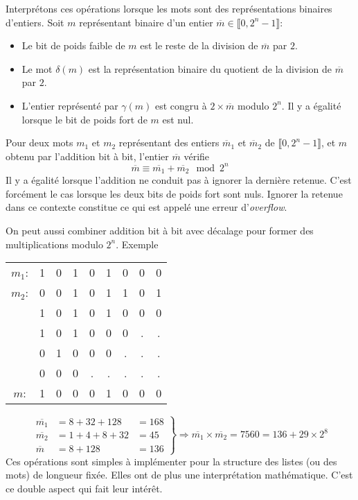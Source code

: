 \begin{enumerate}
Interprétons ces opérations lorsque les mots sont des représentations binaires d'entiers. Soit $m$ représentant binaire d'un entier $\overline{m}\in \llbracket 0, 2^{n}-1 \rrbracket$:
\begin{itemize}
  \item Le bit de poids faible de $m$ est le reste de la division de $\overline{m}$ par $2$.
  \item Le mot $\delta(m)$ est la représentation binaire du quotient de la division de $\overline{m}$ par $2$.
  \item L'entier représenté par $\gamma(m)$ est congru à $2\times\overline{m}$ modulo $2^{n}$. Il y a égalité lorsque le bit de poids fort de $m$ est nul.
\end{itemize}
Pour deux mots $m_1$ et $m_2$ représentant des entiers $\overline{m}_1$ et $\overline{m}_2$ de $ \llbracket 0, 2^{n}-1 \rrbracket$, et $m$ obtenu par l'addition bit à bit, l'entier $\overline{m}$ vérifie
\begin{displaymath}
  \overline{m} \equiv \overline{m_1} + \overline{m_2} \mod 2^{n}
\end{displaymath}
Il y a égalité lorsque l'addition ne conduit pas à ignorer la dernière retenue. C'est forcément le cas lorsque les deux bits de poids fort sont nuls. Ignorer la retenue dans ce contexte constitue ce qui est appelé une erreur d'\emph{overflow}.
\end{enumerate}
On peut aussi combiner addition bit à bit avec décalage pour former des multiplications modulo $2^n$.
Exemple
  \begin{center}
  \begin{tabular}{ccccccccc}
    $m_1$: & 1 & 0 & 1 & 0 & 1 & 0 & 0 & 0 \\
    $m_2$: & 0 & 0 & 1 & 0 & 1 & 1 & 0 & 1 \\ \hline 
           & 1 & 0 & 1 & 0 & 1 & 0 & 0 & 0 \\
           & 1 & 0 & 1 & 0 & 0 & 0 & . & .  \\
           & 0 & 1 & 0 & 0 & 0 & . & . & . \\
           & 0 & 0 & 0 & . & . & . & . & . \\ \hline
    $m$:   & 1 & 0 & 0 & 0 & 1 & 0 & 0 & 0
  \end{tabular}    
  \end{center}
  
\begin{displaymath}
\left. 
\begin{aligned}
\overline{m_1} &= 8 + 32 + 128 &= 168 \\
\overline{m_2} &= 1 + 4 + 8 + 32 &= 45 \\
\overline{m} &=  8 + 128 &= 136
\end{aligned}
\right\rbrace \Rightarrow
\overline{m_1}\times \overline{m_2} = 7560 =136 + 29\times 2^8 
\end{displaymath}
Ces opérations sont simples à implémenter pour la structure des listes (ou des mots) de longueur fixée. Elles ont de plus une interprétation mathématique. C'est ce double aspect qui fait leur intérêt.

